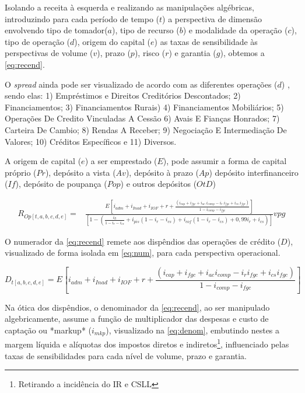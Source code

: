 \documentclass[
  12pt,
  12pt,
  openright,
  oneside,
  a4paper,
  chapter=TITLE,
  section=TITLE,
  subsection=TITLE,
  subsubsection=TITLE,
  english,
  portugues,
  sumario=tradicional]{abntex2}
\begin{document}
\begin{apendicesenv}
Isolando a receita à esquerda e realizando as manipulações algébricas, introduzindo para cada período de tempo ($t$) a perspectiva de dimensão envolvendo tipo de tomador($a$), tipo de recurso ($b$) e modalidade da operação ($c$), tipo de operação ($d$), origem do capital ($e$) as taxas de sensibilidade às perspectivas de volume ($v$), prazo ($p$), risco ($r$) e garantia ($g$), obtemos a \autoref{eq:recend}.

O \emph{spread} ainda pode ser visualizado de acordo com as diferentes operações ($d$) , sendo elas: 1) Empréstimos e Direitos Creditórios Descontados; 2) Financiamentos; 3) Financiamentos Rurais) 4) Financiamentos Mobiliários; 5) Operações De Credito Vinculadas A Cessão 6) Avais E Fianças Honrados; 7) Carteira De Cambio; 8) Rendas A Receber; 9) Negociação E Intermediação De Valores; 10) Créditos Específicos e 11) Diversos.

A origem de capital ($e$) a ser emprestado ($E$), pode assumir a forma de capital próprio ($Pr$), depósito a vista ($Av$), depósito à prazo ($Ap$) depósito interfinanceiro ($If$), depósito de poupança ($Pop$) e outros depósitos ($OtD$)



\begin{equation}\label{eq:recend}
\begin{aligned}
R_{Op[t,a,b,c,d,e]} = & \frac{E_{} \left[ i_{adm} + i_{Inad} + i_{IOF} + r +  \frac{(i_{cap} + i_{fgc} + i_{ac}.i_{comp} - i_{r}.i_{fgc}+ i_{cs}.i_{fgc})}{1 - i_{comp} - i_{fgc}} \right]}
{\left[ 1 - (\frac{i_{ll}}{1 - i_{r} - i_{cs}} + i_{pis}(1 - i_{r} - i_{cs}) + i_{cof}(1 - i_{r} - i_{cs}) + 0,99i_{r} + i_{cs})\right]}vpg
\end{aligned}
\end{equation}



O numerador da \autoref{eq:recend} remete aos dispêndios das operações de crédito ($D$), visualizado de forma isolada em \autoref{eq:num}, para cada perspectiva operacional.


\begin{equation}\label{eq:num}
D_{t[a,b,c,d,e]} = E_{} \left[ i_{adm} + i_{Inad} + i_{IOF} + r +  \frac{(i_{cap} + i_{fgc} + i_{ac}i_{comp} - i_{r}i_{fgc}+ i_{cs}i_{fgc})}{1 - i_{comp} - i_{fgc}} \right]
\end{equation}



Na ótica dos dispêndios, o denominador da \autoref{eq:recend}, ao ser manipulado algebricamente, assume a função de multiplicador das despesas e custo de captação ou *markup* ($i_{mkp}$), visualizado na \autoref{eq:denom}, embutindo nestes a margem líquida e alíquotas dos impostos diretos e indiretos\footnote{Retirando a incidência do IR e CSLL}, influenciado pelas taxas de sensibilidades para cada nível de volume, prazo e garantia. 




\end{apendicesenv}
\end{document}
